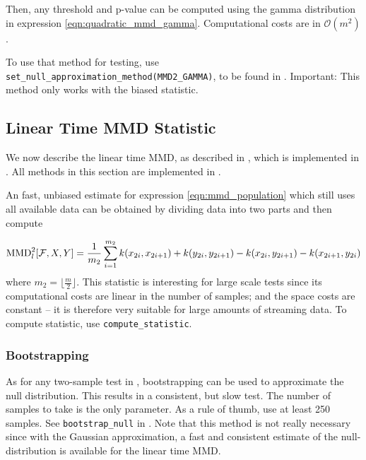 Then, any threshold and p-value can be computed using the gamma distribution in expression \ref{eqn:quadratic_mmd_gamma}. Computational costs are in $\mathcal{O}(m^2)$.

To use that method for testing, use \texttt{set\_null\_approximation\_method(MMD2\_GAMMA)}, to be found in . Important: This method only works with the biased statistic.


\subsection{Linear Time MMD Statistic}
\label{sec:mmd_linear}
We now describe the linear time MMD, as described in \citep[Section
6]{Gretton2012}, which is implemented in \shogun{}. All methods in this section are implemented in .

An fast, unbiased estimate for expression \ref{eqn:mmd_population} which still uses all available data can be obtained by dividing data into two parts and then compute

\begin{align*}
\operatorname{MMD}_l^2[\mathcal{F},X,Y]=\frac{1}{m_2}\sum_{i=1}^{m_2} k(x_{2i},x_{2i+1})+k(y_{2i},y_{2i+1})-k(x_{2i},y_{2i+1})-
  k(x_{2i+1},y_{2i})
\end{align*}
where $ m_2=\lfloor\frac{m}{2} \rfloor$. This statistic is interesting for large scale tests since its computational costs are linear in the number of samples; and the space costs are constant -- it is therefore very suitable for large amounts of streaming data. To compute statistic, use \texttt{compute\_statistic}.

\subsubsection{Bootstrapping}
As for any two-sample test in \shogun{}, bootstrapping can be used to approximate the null distribution. This results in a consistent, but slow test. The number of samples to take is the only parameter. As a rule of thumb, use at least 250 samples.
See \texttt{bootstrap\_null} in . Note that this method is not really necessary since with the Gaussian approximation, a fast and consistent estimate of the null-distribution is available for the linear time MMD.

